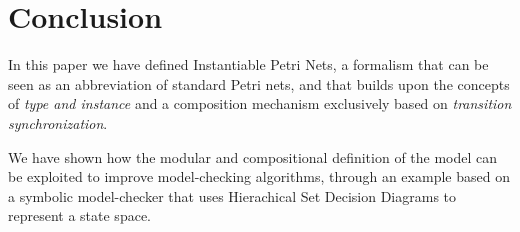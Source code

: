 \section{Conclusion}

In this paper we have defined Instantiable Petri Nets, a formalism
that can be seen as an abbreviation of standard Petri nets, and that 
builds upon the concepts of \emph{type and instance} and a composition
 mechanism exclusively based on \emph{transition synchronization}.

We have shown how the modular and compositional definition of the
model can be exploited to improve model-checking algorithms, through
an example based on a symbolic model-checker that uses Hierachical Set
 Decision Diagrams to represent a state space.
